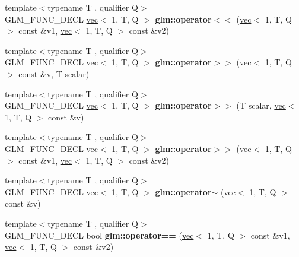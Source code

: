 \begin{DoxyCompactItemize}
{\footnotesize template$<$typename T , qualifier Q$>$ }\\G\+L\+M\+\_\+\+F\+U\+N\+C\+\_\+\+D\+E\+CL \hyperlink{structglm_1_1vec}{vec}$<$ 1, T, Q $>$ {\bfseries glm\+::operator$<$$<$} (\hyperlink{structglm_1_1vec}{vec}$<$ 1, T, Q $>$ const \&v1, \hyperlink{structglm_1_1vec}{vec}$<$ 1, T, Q $>$ const \&v2)
\item 
\mbox{\label{group__ext__vec1_ga4fbe19c5f5fba90c89934a540de87bc5}} 
{\footnotesize template$<$typename T , qualifier Q$>$ }\\G\+L\+M\+\_\+\+F\+U\+N\+C\+\_\+\+D\+E\+CL \hyperlink{structglm_1_1vec}{vec}$<$ 1, T, Q $>$ {\bfseries glm\+::operator$>$$>$} (\hyperlink{structglm_1_1vec}{vec}$<$ 1, T, Q $>$ const \&v, T scalar)
\item 
\mbox{\label{group__ext__vec1_ga41efbda33c026dd25484c09e211eb68e}} 
{\footnotesize template$<$typename T , qualifier Q$>$ }\\G\+L\+M\+\_\+\+F\+U\+N\+C\+\_\+\+D\+E\+CL \hyperlink{structglm_1_1vec}{vec}$<$ 1, T, Q $>$ {\bfseries glm\+::operator$>$$>$} (T scalar, \hyperlink{structglm_1_1vec}{vec}$<$ 1, T, Q $>$ const \&v)
\item 
\mbox{\label{group__ext__vec1_gaf53e1d5cb9aa5de1b2a77bf40c275361}} 
{\footnotesize template$<$typename T , qualifier Q$>$ }\\G\+L\+M\+\_\+\+F\+U\+N\+C\+\_\+\+D\+E\+CL \hyperlink{structglm_1_1vec}{vec}$<$ 1, T, Q $>$ {\bfseries glm\+::operator$>$$>$} (\hyperlink{structglm_1_1vec}{vec}$<$ 1, T, Q $>$ const \&v1, \hyperlink{structglm_1_1vec}{vec}$<$ 1, T, Q $>$ const \&v2)
\item 
\mbox{\label{group__ext__vec1_ga923256ef3abbc940c475ddb5e2bca75b}} 
{\footnotesize template$<$typename T , qualifier Q$>$ }\\G\+L\+M\+\_\+\+F\+U\+N\+C\+\_\+\+D\+E\+CL \hyperlink{structglm_1_1vec}{vec}$<$ 1, T, Q $>$ {\bfseries glm\+::operator$\sim$} (\hyperlink{structglm_1_1vec}{vec}$<$ 1, T, Q $>$ const \&v)
\item 
\mbox{\label{group__ext__vec1_gaa9cd0f18629236bade24765fd5d2616b}} 
{\footnotesize template$<$typename T , qualifier Q$>$ }\\G\+L\+M\+\_\+\+F\+U\+N\+C\+\_\+\+D\+E\+CL bool {\bfseries glm\+::operator==} (\hyperlink{structglm_1_1vec}{vec}$<$ 1, T, Q $>$ const \&v1, \hyperlink{structglm_1_1vec}{vec}$<$ 1, T, Q $>$ const \&v2)

\end{DoxyCompactItemize}
